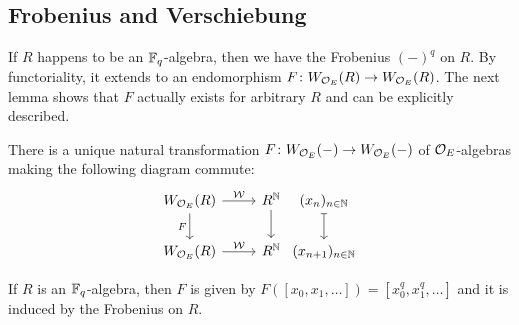 \subsection{Frobenius and Verschiebung}
If $R$ happens to be an $\mathbb{F}_q$-algebra, then we have the Frobenius $(-)^q$ on $R$. By functoriality, it extends to an endomorphism $F\colon W_{\Oo_E}(R)\morphism W_{\Oo_E}(R)$. The next lemma shows that $F$ actually exists for arbitrary $R$ and can be explicitly described.
\begin{lem}\label{lem:WittFrob}
	\begin{numerate}
		\item There is a unique natural transformation $F\colon W_{\Oo_E}(-)\morphism W_{\Oo_E}(-)$ of $\mathcal{O}_E$-algebras making the following diagram commute:
		\begin{equation*}
			\begin{tikzcd}
				W_{\Oo_E}(R)\rar["\Ww"]\dar["F"{swap}] & R^\IN\dar &[-2.4em] (x_n)_{n\in\IN}\dar[|->]\\
				W_{\Oo_E}(R)\rar["\Ww"] & R^\IN &[-2.4em] (x_{n+1})_{n\in \IN}
			\end{tikzcd}
		\end{equation*}
		\item If $R$ is an $\mathbb{F}_q$-algebra, then $F$ is given by $F([x_0,x_1,\dotsc])=[x_0^q,x_1^q,\dotsc]$ and it is induced by the Frobenius on $R$.
	\end{numerate}
\end{lem}
